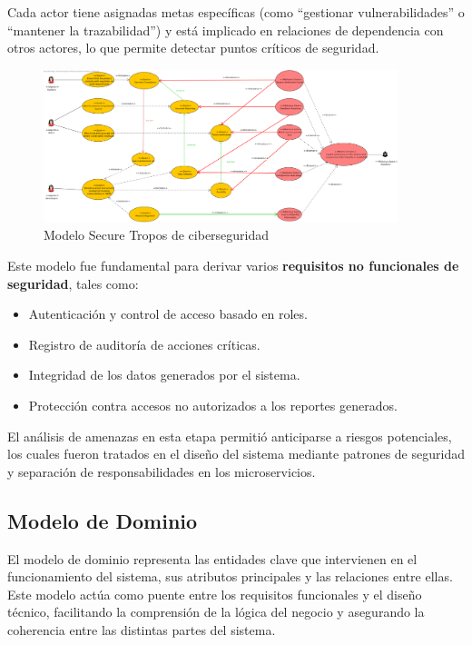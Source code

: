 \documentclass[11pt]{article}
\begin{document}
Cada actor tiene asignadas metas específicas (como ``gestionar vulnerabilidades'' o ``mantener la trazabilidad'') y está implicado en relaciones de dependencia con otros actores, lo que permite detectar puntos críticos de seguridad.

\begin{figure}[H]
    \centering
    \includegraphics[width=0.92\textwidth]{images/Secure_Tropos_Model_Group.png}
    \caption{Modelo Secure Tropos de ciberseguridad}
\end{figure}

Este modelo fue fundamental para derivar varios \textbf{requisitos no funcionales de seguridad}, tales como:

\begin{itemize}
    \item Autenticación y control de acceso basado en roles.
    \item Registro de auditoría de acciones críticas.
    \item Integridad de los datos generados por el sistema.
    \item Protección contra accesos no autorizados a los reportes generados.
\end{itemize}

El análisis de amenazas en esta etapa permitió anticiparse a riesgos potenciales, los cuales fueron tratados en el diseño del sistema mediante patrones de seguridad y separación de responsabilidades en los microservicios.

\subsection{Modelo de Dominio}

El modelo de dominio representa las entidades clave que intervienen en el funcionamiento del sistema, sus atributos principales y las relaciones entre ellas. Este modelo actúa como puente entre los requisitos funcionales y el diseño técnico, facilitando la comprensión de la lógica del negocio y asegurando la coherencia entre las distintas partes del sistema.
\end{document}
